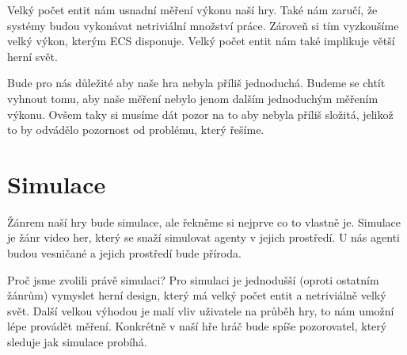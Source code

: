 Velký počet entit nám usnadní měření výkonu naší hry. Také nám zaručí, že systémy budou vykonávat netriviální množství práce. Zároveň si tím vyzkoušíme velký výkon, kterým ECS disponuje. Velký počet entit nám také implikuje větší herní svět.

Bude pro nás důležité aby naše hra nebyla příliš jednoduchá. Budeme se chtít vyhnout tomu, aby naše měření nebylo jenom dalším jednoduchým měřením výkonu. Ovšem taky si musíme dát pozor na to aby nebyla příliš složitá, jelikož to by odvádělo pozornost od problému, který řešíme.


\section{Simulace}
Žánrem naší hry bude simulace, ale řekněme si nejprve co to vlastně je. Simulace je žánr video her, který se snaží simulovat agenty v jejich prostředí. U nás agenti budou vesničané a jejich prostředí bude příroda.

Proč jsme zvolili právě simulaci? Pro simulaci je jednodušší (oproti ostatním žánrům) vymyslet herní design, který má velký počet entit a netriviálně velký svět. Další velkou výhodou je malí vliv uživatele na průběh hry, to nám umožní lépe provádět měření. Konkrétně v naší hře hráč bude spíše pozorovatel, který sleduje jak simulace probíhá.

